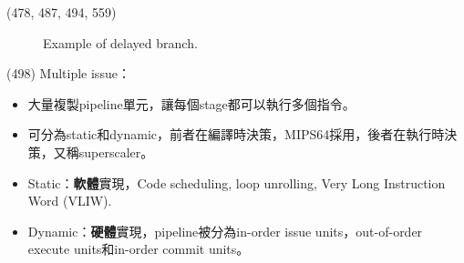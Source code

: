\begin{theorem}{(478, 487, 494, 559)}
\begin{itemize}
\begin{itemize}
\begin{figure}[H]
                \caption{Example of delayed branch.}
                \label{img:delayed-branch}
            \end{figure}
        \end{itemize}
    \end{itemize}
\end{theorem}

\item \begin{theorem}{(498)} Multiple issue：\begin{itemize}
        \item 大量複製pipeline單元，讓每個stage都可以執行多個指令。
        \item 可分為static和dynamic，前者在編譯時決策，MIPS64採用，後者在執行時決策，又稱superscaler。
        \item Static：\textbf{軟體}實現，Code scheduling, loop unrolling, Very Long Instruction Word (VLIW).
        \item Dynamic：\textbf{硬體}實現，pipeline被分為in-order issue units，out-of-order execute units和in-order commit units。
    \end{itemize}
\end{theorem}
